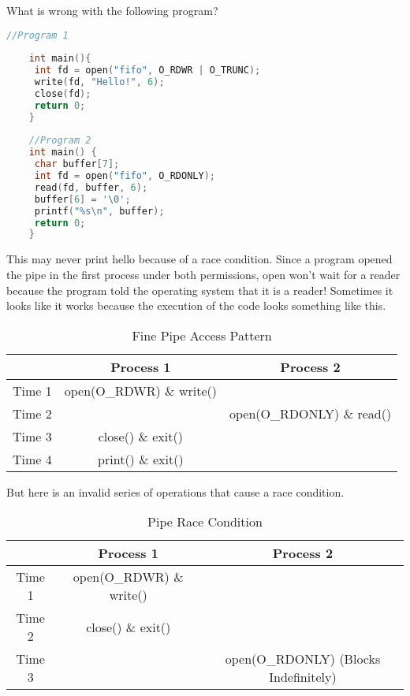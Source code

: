 What is wrong with the following program?
	 
\begin{lstlisting}[language=C]
	//Program 1
	 
	int main(){
	 int fd = open("fifo", O_RDWR | O_TRUNC);
	 write(fd, "Hello!", 6);
	 close(fd);
	 return 0;
	}
	 
	//Program 2
	int main() {
	 char buffer[7];
	 int fd = open("fifo", O_RDONLY);
	 read(fd, buffer, 6);
	 buffer[6] = '\0';
	 printf("%s\n", buffer);
	 return 0;
	}
\end{lstlisting}
	 
This may never print hello because of a race condition.
Since a program opened the pipe in the first process under both permissions, open won't wait for a reader because the program told the operating system that it is a reader!
Sometimes it looks like it works because the execution of the code looks something like this.
	 
\begin{center}
	\begin{table}[h]
		\caption{Fine Pipe Access Pattern}
		\begin{tabular}{|c|c|c|}
			       & Process 1                & Process 2                 \\ \hline
			Time 1 & open(O\_RDWR) \& write() &                           \\
			Time 2 &                          & open(O\_RDONLY) \& read() \\
			Time 3 & close() \& exit()        &                           \\
			Time 4 & print() \& exit()        &                           \\
		\end{tabular}
	\end{table}
\end{center}
	 
But here is an invalid series of operations that cause a race condition.
	 
\begin{center}
	\begin{table}[h]
		\caption{Pipe Race Condition}
		\begin{tabular}{|c|c|c|}
			       & Process 1                & Process 2                             \\ \hline
			Time 1 & open(O\_RDWR) \& write() &                                       \\
			Time 2 & close() \& exit()        &                                       \\
			Time 3 &                          & open(O\_RDONLY) (Blocks Indefinitely) \\
		\end{tabular}
	\end{table}
\end{center}
	 
